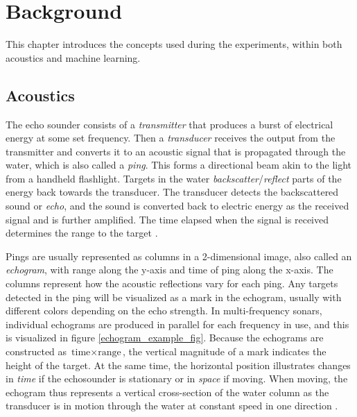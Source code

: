 \chapter{Background}
    This chapter introduces the concepts used during the experiments, within both acoustics and machine learning.
    
    
\section{Acoustics}\label{acoustics}
    
    The echo sounder consists of a \textit{transmitter} that produces a burst of electrical energy at some set frequency. Then a \textit{transducer} receives the output from the transmitter and converts it to an acoustic signal that is propagated through the water, which is also called a \textit{ping}. This forms a directional beam akin to the light from a handheld flashlight. Targets in the water \textit{backscatter}/\textit{reflect} parts of the energy back towards the transducer. The transducer detects the backscattered sound or \textit{echo}, and the sound is converted back to electric energy as the received signal and is further amplified. The time elapsed when the signal is received determines the range to the target \cite{simmonds2008fisheries}.
    
    Pings are usually represented as columns in a 2-dimensional image, also called an \textit{echogram}, with range along the y-axis and time of ping along the x-axis. The columns represent how the acoustic reflections vary for each ping. Any targets detected in the ping will be visualized as a mark in the echogram, usually with different colors depending on the echo strength. In multi-frequency sonars, individual echograms are produced in parallel for each frequency in use, and this is visualized in figure \ref{echogram_example_fig}. Because the echograms are constructed as $\text{time} \times \text{range}$, the vertical magnitude of a mark indicates the height of the target. At the same time,  the horizontal position illustrates changes in \textit{time} if the echosounder is stationary or in \textit{space} if moving. When moving, the echogram thus represents a vertical cross-section of the water column as the transducer is in motion through the water at constant speed in one direction \cite{simmonds2008fisheries}.
    
